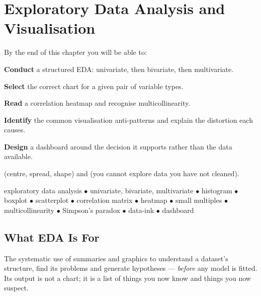 \chapter{Exploratory Data Analysis and Visualisation}\label{ch:eda}

\begin{outcomes}
By the end of this chapter you will be able to:
\begin{tight}
  \item \textbf{Conduct} a structured EDA: univariate, then bivariate, then multivariate.
  \item \textbf{Select} the correct chart for a given pair of variable types.
  \item \textbf{Read} a correlation heatmap and recognise multicollinearity.
  \item \textbf{Identify} the common visualisation anti-patterns and explain the distortion each causes.
  \item \textbf{Design} a dashboard around the decision it supports rather than the data available.
\end{tight}
\end{outcomes}

\begin{prereq}
 (centre, spread, shape) and  (you cannot
explore data you have not cleaned).
\end{prereq}

\begin{keyterms}
exploratory data analysis $\bullet$ univariate, bivariate, multivariate $\bullet$
histogram $\bullet$ boxplot $\bullet$ scatterplot $\bullet$ correlation matrix
$\bullet$ heatmap $\bullet$ small multiples $\bullet$ multicollinearity $\bullet$
Simpson's paradox $\bullet$ data-ink $\bullet$ dashboard
\end{keyterms}

\section{What EDA Is For}

\begin{definitionbox}
The systematic use of summaries and graphics to understand a dataset's structure,
find its problems and generate hypotheses --- \emph{before} any model is fitted.
Its output is not a chart; it is a list of things you now know and things you now
suspect.
\end{definitionbox}

